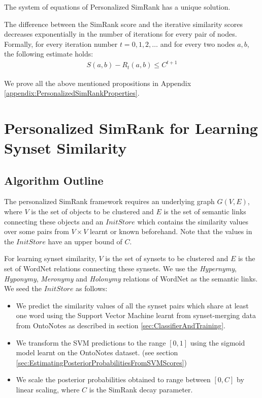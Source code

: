 \begin{proposition}
The system of equations of Personalized SimRank has a unique solution. 
\end{proposition}


\begin{proposition} The difference between the SimRank score and the iterative similarity scores decreases exponentially in the number of iterations for every pair of nodes. Formally, for every iteration number $t = 0, 1, 2, \ldots$ and for every two nodes $a, b$, the following estimate holds:
\begin{align}
S(a,b) - R_{t}(a,b) \leq C^{t+1} \label{eq:convergence}
\end{align}
\end{proposition}

\noindent
We prove all the above mentioned propositions in Appendix \ref{appendix:PersonalizedSimRankProperties}.

\section{Personalized SimRank for Learning Synset Similarity}
\label{section:PersonalizedSimRankForLearningSynsetSimilarity}


\subsection{Algorithm Outline}
\label{section:semiSupervisedAlgoOutline}
The personalized SimRank framework requires an underlying graph $G(V,E)$, where $V$ is the set of objects to be clustered and $E$ is the set of semantic links connecting these objects and an $InitStore$ which contains the similarity values over some pairs from $V\times V$ learnt or known beforehand. Note that the values in the $InitStore$ have an upper bound of $C$.

For learning synset similarity, $V$ is the set of synsets to be clustered and $E$ is the set of WordNet relations connecting these synsets. We use the \textit{Hypernymy}, \textit{Hyponymy}, \textit{Meronymy} and \textit{Holonymy} relations of WordNet as the semantic links. We seed the $InitStore$ as follows:
\begin{itemize}
\item We predict the similarity values of all the synset pairs which share at least one word using the Support Vector Machine learnt from synset-merging data from OntoNotes \citep{Hovy:2006} as described in section \ref{sec:ClassifierAndTraining}.
\item We transform the SVM predictions to the range $[0,1]$ using the sigmoid model learnt on the OntoNotes dataset. (see section \ref{sec:EstimatingPosteriorProbabilitiesFromSVMScores})
\item We scale the posterior probabilities obtained to range between $[0,C]$ by linear scaling, where $C$ is the SimRank decay parameter.
\end{itemize}

